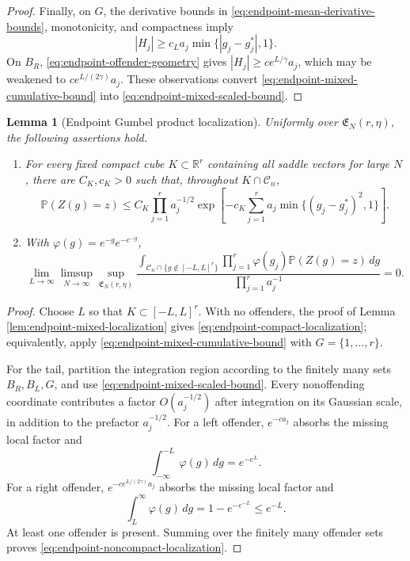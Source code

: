 \documentclass[11pt]{article}
\newtheorem{lemma}[theorem]{Lemma}
\theoremstyle{remark}
\newcommand{\Pp}{\mathbb P}
\newcommand{\dd}{\,d}
\begin{document}
\begin{proof}
Finally, on \(G\), the derivative bounds in
\eqref{eq:endpoint-mean-derivative-bounds}, monotonicity, and compactness imply
\[
        |H_j|\ge c_La_j\min\{|g_j-g_j^*|,1\}.
\tag{8.26}\label{eq:endpoint-mean-displacement}
\]
On \(B_R\), \eqref{eq:endpoint-offender-geometry} gives
\(|H_j|\ge ce^{L/\gamma}a_j\), which may be weakened to
\(ce^{L/(2\gamma)}a_j\).  These observations convert
\eqref{eq:endpoint-mixed-cumulative-bound} into
\eqref{eq:endpoint-mixed-scaled-bound}.
\end{proof}

\begin{lemma}[Endpoint Gumbel product localization]
\label{lem:endpoint-gumbel-localization}
Uniformly over \(\mathfrak E_N(r,\eta)\), the following assertions hold.

\begin{enumerate}[label=(\roman*)]
\item For every fixed compact cube \(K\subset\mathbb R^r\) containing all
saddle vectors for large \(N\), there are \(C_K,c_K>0\) such that, throughout
\(K\cap\mathscr C_n\),
\[
        \Pp(Z(g)=z)
        \le C_K\prod_{j=1}^ra_j^{-1/2}
        \exp\left[-c_K\sum_{j=1}^r
        a_j\min\{(g_j-g_j^*)^2,1\}\right].
\tag{8.27}\label{eq:endpoint-compact-localization}
\]
\item With \(\varphi(g)=e^{-g}e^{-e^{-g}}\),
\[
\lim_{L\to\infty}\limsup_{N\to\infty}
\sup_{\mathfrak E_N(r,\eta)}
\frac{
\displaystyle
\int_{\mathscr C_n\cap\{g\notin[-L,L]^r\}}
\prod_{j=1}^r\varphi(g_j)\Pp(Z(g)=z)\dd g
}{\prod_{j=1}^ra_j^{-1}}=0.
\tag{8.28}\label{eq:endpoint-noncompact-localization}
\]
\end{enumerate}
\end{lemma}

\begin{proof}
Choose \(L\) so that \(K\subset[-L,L]^r\).  With no offenders, the proof of
Lemma \ref{lem:endpoint-mixed-localization} gives
\eqref{eq:endpoint-compact-localization}; equivalently, apply
\eqref{eq:endpoint-mixed-cumulative-bound} with \(G=\{1,\ldots,r\}\).

For the tail, partition the integration region according to the finitely many
sets \(B_R,B_L,G\), and use \eqref{eq:endpoint-mixed-scaled-bound}.  Every
nonoffending coordinate contributes a factor \(O(a_j^{-1/2})\) after
integration on its Gaussian scale, in addition to the prefactor
\(a_j^{-1/2}\).  For a left offender, \(e^{-ca_j}\) absorbs the missing local
factor and
\[
        \int_{-\infty}^{-L}\varphi(g)\dd g=e^{-e^L}.
\]
For a right offender, \(e^{-ce^{L/(2\gamma)}a_j}\) absorbs the missing local
factor and
\[
        \int_L^\infty\varphi(g)\dd g
        =1-e^{-e^{-L}}\le e^{-L}.
\]
At least one offender is present.  Summing over the finitely many offender sets
proves \eqref{eq:endpoint-noncompact-localization}.
\end{proof}
\end{document}
